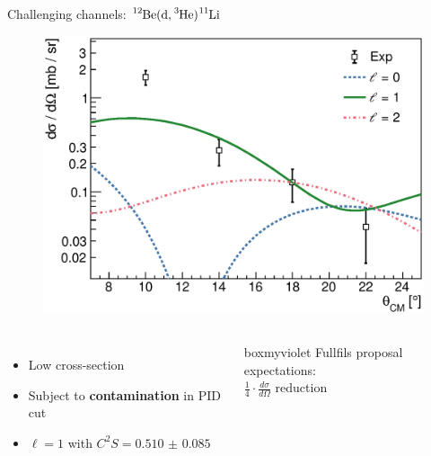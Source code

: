 \documentclass[sans,
frameno, %
mp,
usenames,dvipsnames, %
onlytextwidth, %
t,%
11pt]{beamer}
\newcommand{\iso}[2]{\ce{^{#1}#2}}
\begin{document}
\begin{frame}{Challenging channels: $\iso{12}{Be}(\textrm{d}, \iso{3}{He})\iso{11}{Li}$}
\begin{figure}
\begin{minipage}[t]{0.48\linewidth}
            \includegraphics[width=\textwidth]{figures/Workshop/12Be_d3He_xs.eps}
        \end{minipage}
    \end{figure}
    \bigskip
    \begin{columns}[c]
        {
            \begin{itemize}
                \item Low cross-section
                \item Subject to \textbf{contamination} in PID cut
                \item $\ell = 1$ with $C^{2}S = \num{0.510(85)}$
            \end{itemize}
        }\hfill
        {
            \begin{beamercolorbox}[sep=1ex, center, rounded=true]{boxmyviolet}
                Fullfils proposal expectations: \\
                  $\frac{1}{4} \cdot \frac{d\sigma}{d\Omega}$ reduction
            \end{beamercolorbox}
        }
    \end{columns}
\end{frame}
\end{document}
